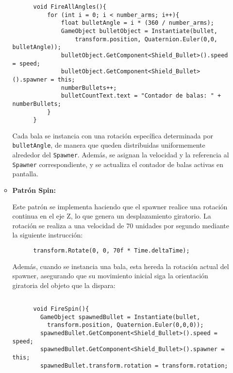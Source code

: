 \documentclass[11pt]{article}
\begin{document}
\begin{itemize}
\begin{itemize}
      \begin{verbatim}
      void FireAllAngles(){
          for (int i = 0; i < number_arms; i++){
              float bulletAngle = i * (360 / number_arms);
              GameObject bulletObject = Instantiate(bullet, 
                  transform.position, Quaternion.Euler(0,0, bulletAngle));
              bulletObject.GetComponent<Shield_Bullet>().speed = speed;
              bulletObject.GetComponent<Shield_Bullet>().spawner = this;  
              numberBullets++;
              bulletCountText.text = "Contador de balas: " + numberBullets;
          }
      }
      \end{verbatim}

      \vspace{0.5cm}

      Cada bala se instancia con una rotación específica determinada por \texttt{bulletAngle}, de manera que queden distribuidas uniformemente alrededor del \texttt{Spawner}. Además, se asignan la velocidad y la referencia al \texttt{Spawner} correspondiente, y se actualiza el contador de balas activas en pantalla.

      \vspace{0.5cm}
      
      \item \textbf{Patrón Spin:}
      
      \vspace{0.5cm}
      
      Este patrón se implementa haciendo que el spawner realice una rotación continua en el eje Z, lo que genera un desplazamiento giratorio. La rotación se realiza a una velocidad de 70 unidades por segundo mediante la siguiente instrucción:

      \begin{verbatim}
      transform.Rotate(0, 0, 70f * Time.deltaTime);
      \end{verbatim}

      Además, cuando se instancia una bala, esta hereda la rotación actual del spawner, asegurando que su movimiento inicial siga la orientación giratoria del objeto que la dispara:

      \begin{verbatim}
        
      void FireSpin(){
        GameObject spawnedBullet = Instantiate(bullet,
          transform.position, Quaternion.Euler(0,0,0));
        spawnedBullet.GetComponent<Shield_Bullet>().speed = speed;
        spawnedBullet.GetComponent<Shield_Bullet>().spawner = this;
        spawnedBullet.transform.rotation = transform.rotation;


\end{verbatim}
\end{itemize}
\end{itemize}
\end{document}
